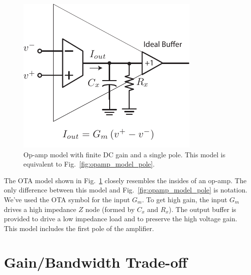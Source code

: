 \begin{figure}[tb]
\begin{center}
\includegraphics[width=.5\columnwidth]{opamp_ota_model_gain}
\end{center}
\caption{Op-amp model with finite DC gain and a single pole. This model is equivalent to Fig.~\ref{fig:opamp_model_pole}.} \label{fig:opamp_ota_model_gain}
\end{figure}


The OTA model shown in Fig.~\ref{fig:opamp_ota_model_gain} closely resembles the insides of an op-amp.  The only difference between this model and Fig.~\ref{fig:opamp_model_pole} is notation.  We've used the OTA symbol for 
the input $G_m$.  To get high gain, the input $G_m$ drives a high impedance $Z$ node (formed by $C_x$ and $R_x$). The output buffer is provided to drive a low impedance load and to preserve the high voltage gain.  This model includes the first pole of the amplifier.
 

%
%
 


\section{Gain/Bandwidth Trade-off}


